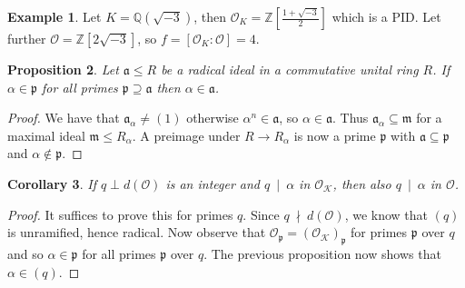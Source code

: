 \documentclass{scrartcl}
\newcommand{\Z}{\mathbb{Z}}
\newcommand{\divides}{\ \mid \ }
\newcommand{\notdivides}{\ \nmid \ }
\newcommand{\K}{\mathcal{K}}
\newcommand{\p}{\mathfrak{p}}
\renewcommand{\a}{\mathfrak{a}}
\renewcommand{\O}{\mathcal{O}}
\newtheorem{prop}{Proposition}[section]
\newtheorem{corollary}[prop]{Corollary}
\theoremstyle{definition}
\newtheorem{example}[prop]{Example}
\begin{document}
\begin{example}
    Let $K = \mathbb{Q}(\sqrt{-3})$, then $\O_K = \Z[\frac {1 + \sqrt{-3}} 2]$ which is a PID.
    Let further $\O = \Z[2\sqrt{-3}]$, so $f = [\O_K : \O] = 4$.
\end{example}
\begin{prop}
    Let $\a \leq R$ be a radical ideal in a commutative unital ring $R$.
    If $\alpha \in \p$ for all primes $\p \supseteq \a$ then $\alpha \in \a$.
\end{prop}
\begin{proof}
    We have that $\a_\alpha \neq (1)$ otherwise $\alpha^n \in \a$, so $\alpha \in \a$.
    Thus $\a_\alpha \subseteq \mathfrak{m}$ for a maximal ideal $\mathfrak{m} \leq R_\alpha$.
    A preimage under $R \to R_\alpha$ is now a prime $\p$ with $\a \subseteq \p$ and $\alpha \notin \p$.
\end{proof}
\begin{corollary}
    If $q \perp d(\O)$ is an integer and $q \divides \alpha$ in $\O_\K$, then also $q \divides \alpha$ in $\O$.
\end{corollary}
\begin{proof}
    It suffices to prove this for primes $q$.
    Since $q \notdivides d(\O)$, we know that $(q)$ is unramified, hence radical.
    Now observe that $\O_{\p} = (\O_\K)_\p$ for primes $\p$ over $q$ and so $\alpha \in \p$ for all primes $\p$ over $q$.
    The previous proposition now shows that $\alpha \in (q)$.
\end{proof}
\end{document}
